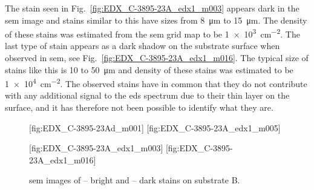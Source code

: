 The stain seen in Fig.~\ref{fig:EDX_C-3895-23A_edx1_m003} appears dark in the \ac{sem} image and stains similar to this have sizes from \SI{8}{\micro\metre} to \SI{15}{\micro\metre}. The density of these stains was estimated from the \ac{sem} grid map to be \SI{1e3}{\centi\metre^{-2}}. The last type of stain appears as a dark shadow on the substrate surface when observed in \ac{sem}, see Fig.~\ref{fig:EDX_C-3895-23A_edx1_m016}. The typical size of stains like this is \SI{10}{} to \SI{50}{\micro\metre} and density of these stains was estimated to be \SI{1e4}{\centi\metre^{-2}}. The observed stains have in common that they do not contribute with any additional signal to the \ac{eds} spectrum due to their thin layer on the surface, and it has therefore not been possible to identify what they are. 
\begin{figure}[htbp]
    \centering
    [fig:EDX_C-3895-23Ad_m001]
    [fig:EDX_C-3895-23A_edx1_m005]
    \par\bigskip
    [fig:EDX_C-3895-23A_edx1_m003]
    [fig:EDX_C-3895-23A_edx1_m016]
    \caption[\Ac{sem} images of stains on substrate B.]{\Ac{sem} images of -- bright and -- dark stains on substrate B.}
    \label{fig:subB_stains}
\end{figure}

